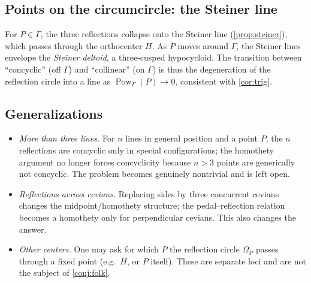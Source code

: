 \documentclass[11pt,a4paper]{article}
\theoremstyle{definition}
\newcommand{\circc}{\Gamma}
\newcommand{\reflc}{\Omega_{P}}
\begin{document}
\subsection{Points on the circumcircle: the Steiner line}

For $P\in\circc$, the three reflections collapse onto the Steiner line (\cref{prop:steiner}), which passes through the orthocenter $H$. As $P$ moves around $\circc$, the Steiner lines envelope the \emph{Steiner deltoid}, a three-cusped hypocycloid. The transition between ``concyclic'' (off $\circc$) and ``collinear'' (on $\circc$) is thus the degeneration of the reflection circle into a line as $\operatorname{Pow}_{\circc}(P)\to0$, consistent with \cref{cor:trig}.

\subsection{Generalizations}

\begin{itemize}
  \item \emph{More than three lines.} For $n$ lines in general position and a point $P$, the $n$ reflections are concyclic only in special configurations; the homothety argument no longer forces concyclicity because $n>3$ points are generically not concyclic. The problem becomes genuinely nontrivial and is left open.
  \item \emph{Reflections across cevians.} Replacing sides by three concurrent cevians changes the midpoint/homothety structure; the pedal--reflection relation becomes a homothety only for perpendicular cevians. This also changes the answer.
  \item \emph{Other centers.} One may ask for which $P$ the reflection circle $\reflc$ passes through a fixed point (e.g.\ $H$, or $P$ itself). These are separate loci and are not the subject of \cref{conj:folk}.
\end{itemize}
\end{document}
